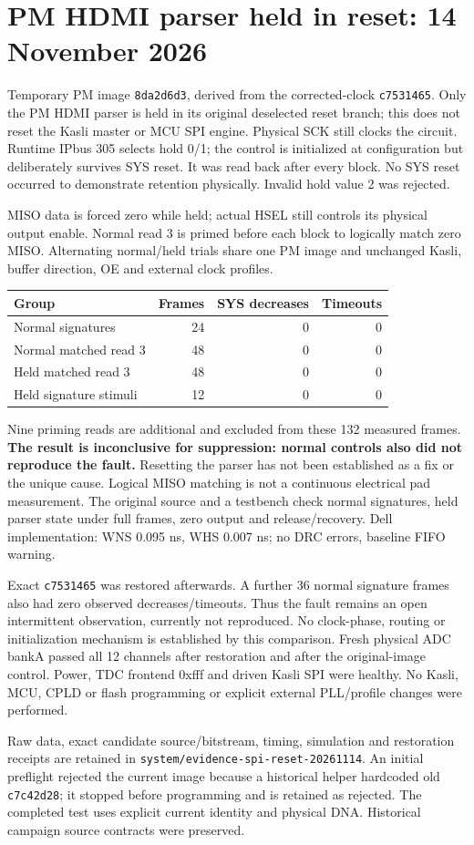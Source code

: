 \clearpage
\section{PM HDMI parser held in reset: 14 November 2026}
Temporary PM image \texttt{8da2d6d3}, derived from the corrected-clock
\texttt{c7531465}. Only the PM HDMI parser is held in its original deselected
reset branch; this does not reset the Kasli master or MCU SPI engine.
Physical SCK still clocks the circuit. Runtime IPbus 305 selects hold 0/1;
the control is initialized at configuration but deliberately survives SYS
reset. It was read back after every block. No SYS reset occurred to demonstrate
retention physically. Invalid hold value 2 was rejected.

MISO data is forced zero while held; actual HSEL still controls its physical
output enable. Normal read 3 is primed before each block to logically match
zero MISO. Alternating normal/held trials share one PM image and unchanged
Kasli, buffer direction, OE and external clock profiles.
\begin{center}\begin{tabular}{lrrr}\toprule
Group & Frames & SYS decreases & Timeouts\\\midrule
Normal signatures &24&0&0\\
Normal matched read 3 &48&0&0\\
Held matched read 3 &48&0&0\\
Held signature stimuli &12&0&0\\\bottomrule\end{tabular}\end{center}
Nine priming reads are additional and excluded from these 132 measured frames.
\textbf{The result is inconclusive for suppression: normal controls also did
not reproduce the fault.} Resetting the parser has not been established as
a fix or the unique cause. Logical MISO matching is not a continuous electrical
pad measurement. The original source and a testbench check normal signatures,
held parser state under full frames, zero output and release/recovery.
Dell implementation: WNS 0.095 ns, WHS 0.007 ns; no DRC errors, baseline FIFO warning.

Exact \texttt{c7531465} was restored afterwards. A further 36 normal signature
frames also had zero observed decreases/timeouts. Thus the fault remains an
open intermittent observation, currently not reproduced. No clock-phase,
routing or initialization mechanism is established by this comparison.
Fresh physical ADC bankA passed all 12 channels after restoration and after
the original-image control. Power, TDC frontend 0xfff and driven Kasli SPI
were healthy. No Kasli, MCU, CPLD or flash programming or explicit external
PLL/profile changes were performed.

Raw data, exact candidate source/bitstream, timing, simulation and restoration
receipts are retained in \texttt{system/evidence-spi-reset-20261114}.
An initial preflight rejected the current image because a historical helper
hardcoded old \texttt{c7c42d28}; it stopped before programming and is retained
as rejected. The completed test uses explicit current identity and physical
DNA. Historical campaign source contracts were preserved.
\clearpage
